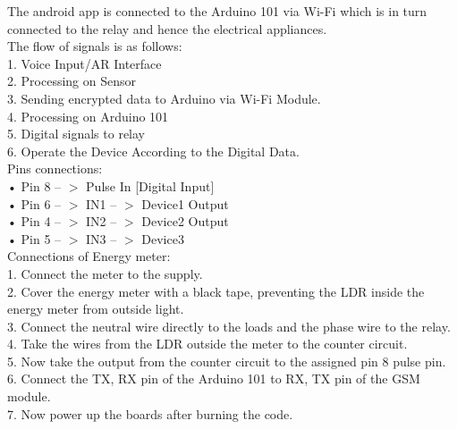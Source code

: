 The android app is connected to the Arduino 101 via Wi-Fi which is in turn connected to the relay and hence the electrical appliances.\\
The flow of signals is as follows:\\
 1. Voice Input/AR Interface\\
 2. Processing on Sensor\\
 3. Sending encrypted data to Arduino via Wi-Fi Module.\\
 4. Processing on Arduino 101\\
 5. Digital signals to relay\\
 6. Operate the Device According to the Digital Data.\\
Pins connections:\\
• Pin 8 -- $>$ Pulse In [Digital Input]\\
• Pin 6 -- $>$ IN1 -- $>$ Device1 Output\\
• Pin 4 -- $>$ IN2 -- $>$ Device2 Output\\
• Pin 5 -- $>$ IN3 -- $>$ Device3\\
Connections of Energy meter:\\
1. Connect the meter to the supply.\\
2. Cover the energy meter with a black tape, preventing the LDR inside the energy meter from outside light.\\
3. Connect the neutral wire directly to the loads and the phase wire to the relay.\\
4. Take the wires from the LDR outside the meter to the counter circuit.\\
5. Now take the output from the counter circuit to the assigned pin 8 pulse pin.\\
6. Connect the TX, RX pin of the Arduino 101 to RX, TX pin of the GSM module.\\
7. Now power up the boards after burning the code.\\
